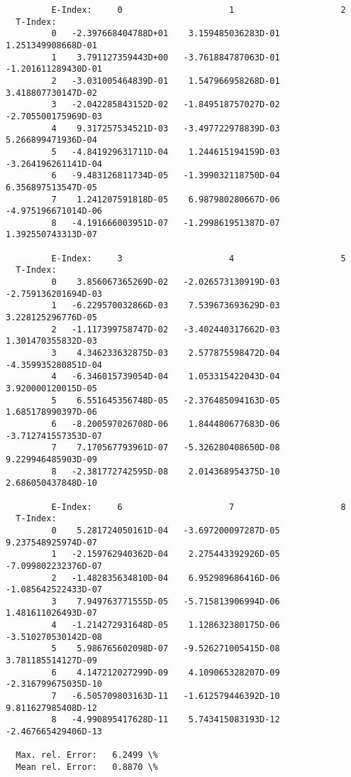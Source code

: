\documentclass[12pt,dvipdfmx]{article}
\begin{document}
\begin{small}\begin{verbatim}
         E-Index:     0                     1                     2
  T-Index:
         0   -2.397668404788D+01    3.159485036283D-01    1.251349908668D-01
         1    3.791127359443D+00   -3.761884787063D-01   -1.201611289430D-01
         2   -3.031005464839D-01    1.547966958268D-01    3.418807730147D-02
         3   -2.042285843152D-02   -1.849518757027D-02   -2.705500175969D-03
         4    9.317257534521D-03   -3.497722978839D-03    5.266899471936D-04
         5   -4.841929631711D-04    1.244615194159D-03   -3.264196261141D-04
         6   -9.483126811734D-05   -1.399032118750D-04    6.356897513547D-05
         7    1.241207591818D-05    6.987980280667D-06   -4.975196671014D-06
         8   -4.191666003951D-07   -1.299861951387D-07    1.392550743313D-07

         E-Index:     3                     4                     5
  T-Index:
         0    3.856067365269D-02   -2.026573130919D-03   -2.759136201694D-03
         1   -6.229570032866D-03    7.539673693629D-03    3.228125296776D-05
         2   -1.117399758747D-02   -3.402440317662D-03    1.301470355832D-03
         3    4.346233632875D-03    2.577875598472D-04   -4.359935280851D-04
         4   -6.346015739054D-04    1.053315422043D-04    3.920000120015D-05
         5    6.551645356748D-05   -2.376485094163D-05    1.685178990397D-06
         6   -8.200597026708D-06    1.844480677683D-06   -3.712741557353D-07
         7    7.170567793961D-07   -5.326280408650D-08    9.229946485903D-09
         8   -2.381772742595D-08    2.014368954375D-10    2.686050437848D-10

         E-Index:     6                     7                     8
  T-Index:
         0    5.281724050161D-04   -3.697200097287D-05    9.237548925974D-07
         1   -2.159762940362D-04    2.275443392926D-05   -7.099802232376D-07
         2   -1.482835634810D-04    6.952989686416D-06   -1.085642522433D-07
         3    7.949763771555D-05   -5.715813906994D-06    1.481611026493D-07
         4   -1.214272931648D-05    1.128632380175D-06   -3.510270530142D-08
         5    5.986765602098D-07   -9.526271005415D-08    3.781185514127D-09
         6    4.147212027299D-09    4.109065328207D-09   -2.316799675035D-10
         7   -6.505709803163D-11   -1.612579446392D-10    9.811627985408D-12
         8   -4.990895417628D-11    5.743415083193D-12   -2.467665429406D-13

  Max. rel. Error:   6.2499 \%
  Mean rel. Error:   0.8870 \%


\end{verbatim}\end{small}
\end{document}
